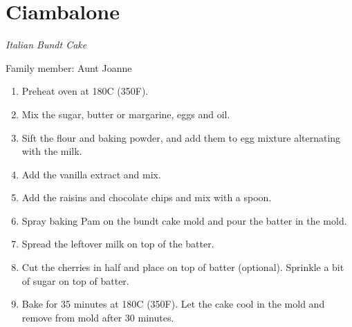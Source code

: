 \chapter{Ciambalone}
\label{ch:ciambalone}


\textit{Italian Bundt Cake}

Family member: Aunt Joanne

\begin{enumerate}
    \item Preheat oven at 180\degree C (350\degree F).
    \item Mix the sugar, butter or margarine, eggs and oil.
    \item Sift the flour and baking powder, and add them to egg mixture alternating with the milk.
    \item Add the vanilla extract and mix.
    \item Add the raisins and chocolate chips and mix with a spoon.
    \item Spray baking Pam on the bundt cake mold and pour the batter in the mold.
    \item Spread the leftover milk on top of the batter.
    \item Cut the cherries in half and place on top of batter (optional). Sprinkle a bit of sugar on top of batter.
    \item Bake for 35 minutes at 180\degree C (350\degree F). Let the cake cool in the mold and remove from mold after 30 minutes.
\end{enumerate}


